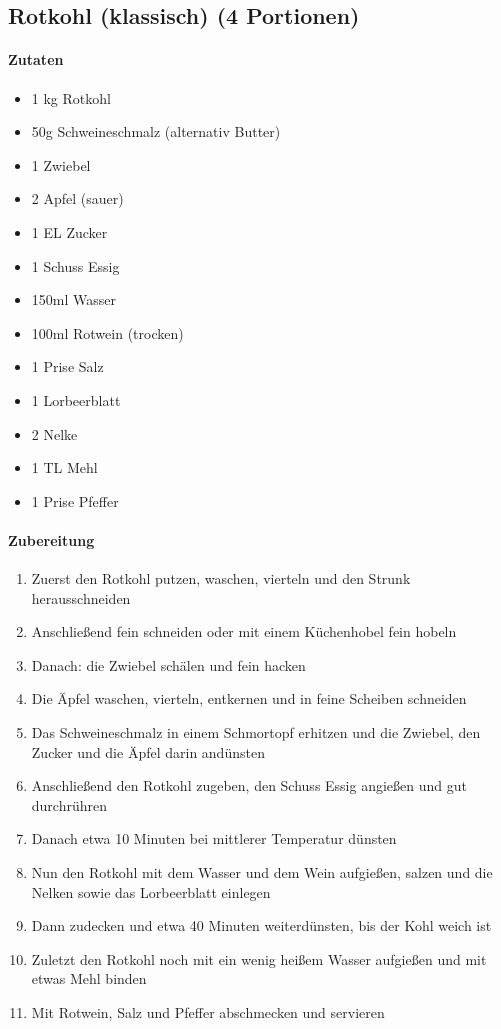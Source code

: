 \newpage
\subsection{Rotkohl (klassisch) (4 Portionen)}
\paragraph{Zutaten}
\begin{itemize}[noitemsep]
	\item 1 kg Rotkohl
	\item 50g Schweineschmalz (alternativ Butter)
	\item 1 Zwiebel
	\item 2 Apfel (sauer)
	\item 1 EL Zucker
	\item 1 Schuss Essig
	\item 150ml Wasser
	\item 100ml Rotwein (trocken)
	\item 1 Prise Salz
	\item 1 Lorbeerblatt
	\item 2 Nelke
	\item 1 TL Mehl 
	\item 1 Prise Pfeffer
\end{itemize}
\paragraph{Zubereitung}
\begin{enumerate}[noitemsep]
	\item Zuerst den Rotkohl putzen, waschen, vierteln und den Strunk herausschneiden
	\item Anschließend fein schneiden oder mit einem Küchenhobel fein hobeln
	\item Danach: die Zwiebel schälen und fein hacken
	\item Die Äpfel waschen, vierteln, entkernen und in feine Scheiben schneiden
	\item Das Schweineschmalz in einem Schmortopf erhitzen und die Zwiebel, den Zucker und die Äpfel darin andünsten
	\item Anschließend den Rotkohl zugeben, den Schuss Essig angießen und gut durchrühren
	\item Danach etwa 10 Minuten bei mittlerer Temperatur dünsten
	\item Nun den Rotkohl mit dem Wasser und dem Wein aufgießen, salzen und die Nelken sowie das Lorbeerblatt einlegen
	\item Dann zudecken und etwa 40 Minuten weiterdünsten, bis der Kohl weich ist
	\item Zuletzt den Rotkohl noch mit ein wenig heißem Wasser aufgießen und mit etwas Mehl binden
	\item Mit Rotwein, Salz und Pfeffer abschmecken und servieren
\end{enumerate}
